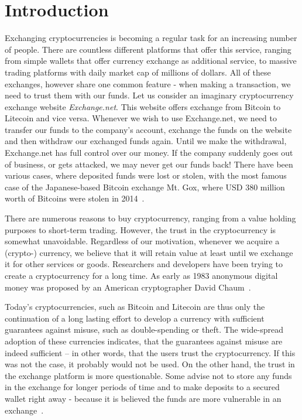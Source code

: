 \section{Introduction}
% 
Exchanging cryptocurrencies is becoming a regular task for an increasing number of people. There are countless different platforms that offer this service, ranging from simple wallets that offer currency exchange as additional service, to massive trading platforms with daily market cap of millions of dollars. All of these exchanges, however share one common feature - when making a transaction, we need to trust them with our funds. Let us consider an imaginary cryptocurrency exchange website \textit{Exchange.net}. This website offers exchange from Bitcoin to Litecoin and vice versa. Whenever we wish to use Exchange.net, we need to transfer our funds to the company's account, exchange the funds on the website and then withdraw our exchanged funds again. Until we make the withdrawal, Exchange.net has full control over our money. If the company suddenly goes out of business, or gets attacked, we may never get our funds back! There have been various cases, where deposited funds were lost or stolen, with the most famous case of the Japanese-based Bitcoin exchange Mt. Gox, where USD 380 million worth of Bitcoins were stolen in 2014~\cite{Popper2014ApparentTimes}.

There are numerous reasons to buy cryptocurrency, ranging from a value holding purposes to short-term trading. However, the trust in the cryptocurrency is somewhat unavoidable. Regardless of our motivation, whenever we acquire a (crypto-) currency, we believe that it will retain value at least until we exchange it for other services or goods. Researchers and developers have been trying to create a cryptocurrency for a long time. As early as 1983 anonymous digital money was proposed by an American cryptographer David Chaum~\cite{Chaum1983BlindPayments}. 

Today's cryptocurrencies, such as Bitcoin and Litecoin are thus only the continuation of a long lasting effort to develop a currency with sufficient guarantees against misuse, such as double-spending or theft. The wide-spread adoption of these currencies indicates, that the guarantees against misuse are indeed sufficient -- in other words, that the users trust the cryptocurrency. If this was not the case, it probably would not be used. On the other hand, the trust in the exchange platform is more questionable. Some advise not to store any funds in the exchange for longer periods of time and to make deposits to a secured wallet right away - because it is believed the funds are more vulnerable in an exchange~\cite{McIntosh2018HowScams}.

